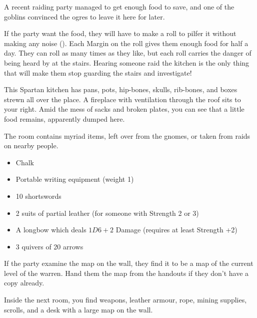 \begin{multicols}{2}
\begin{exampletext}
  A recent raiding party managed to get enough food to save, and one of the goblins convinced the \glspl{ogre} to leave it here for later.
\end{exampletext}

If the party want the food, they will have to make a  roll to pilfer it without making any noise (\tn[8]).
Each Margin on the roll gives them enough food for half a day.
They can roll as many times as they like, but each roll carries the danger of being heard by  at the stairs.
Hearing someone raid the kitchen is the only thing that will make them stop guarding the stairs and investigate!

\begin{boxtext}
  This Spartan kitchen has pans, pots, hip-bones, skulls, rib-bones, and boxes strewn all over the place.
  A fireplace with ventilation through the roof sits to your right.
  Amid the mess of sacks and broken plates, you can see that a little food remains, apparently dumped here.
\end{boxtext}


The room contains myriad items, left over from the gnomes, or taken from raids on nearby people.

\begin{itemize}
  \item
  Chalk
  \item
  Portable writing equipment (\gls{weight} 1)
  \item
  10 shortswords
  \item
  2 suits of partial leather (for someone with Strength 2 or 3)
    \iftoggle{hardcore}{%
    \item
    1 suit of partial leather (for someone with Strength 1 or 2)
  }{
    \item
    2 suits of partial chain (for someone with Strength 1 or 2)
  }
  \item
  A longbow which deals $1D6+2$ Damage (requires at least Strength +2)
  \item
  3 quivers of 20 arrows
\end{itemize}

If the party examine the map on the wall, they find it to be a map of the current level of the \gls{warren}.
Hand them the map from the handouts if they don't have a copy already.

\begin{boxtext}
  Inside the next room, you find weapons, leather armour, rope, mining supplies, scrolls, and a desk with a large map on the wall.


\end{boxtext}
\end{multicols}
